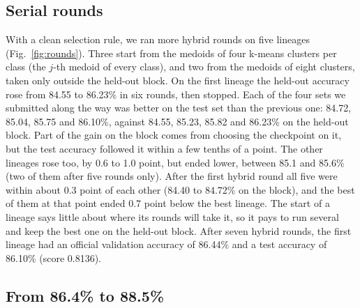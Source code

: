 \documentclass[journal]{IEEEtran}
\begin{document}
\subsection{Serial rounds}
\label{sec:rounds}
With a clean selection rule, we ran more hybrid rounds on five lineages (Fig.~\ref{fig:rounds}). Three start from
the medoids of four k-means clusters per class (the $j$-th medoid of every class), and two from the medoids of
eight clusters, taken only outside the held-out block. On the first lineage the held-out accuracy rose from 84.55
to 86.23\% in six rounds, then stopped. Each of the four sets we submitted along the way was better on the test
set than the previous one: 84.72, 85.04, 85.75 and 86.10\%, against 84.55, 85.23, 85.82 and 86.23\% on the
held-out block. Part of the gain on the block comes from choosing the checkpoint on it, but the test accuracy
followed it within a few tenths of a point. The other lineages rose too, by 0.6 to 1.0 point, but ended lower,
between 85.1 and 85.6\% (two of them after five rounds only). After the first hybrid round all five were within
about 0.3 point of each other (84.40 to 84.72\% on the block), and the best of them at that point ended 0.7 point
below the best lineage. The start of a lineage says little about where its rounds will take it, so it pays to run
several and keep the best one on the held-out block. After seven
hybrid rounds, the first lineage had an official validation accuracy of 86.44\% and a test accuracy of 86.10\% (score
0.8136).

\subsection{From 86.4\% to 88.5\%}
\label{sec:late}
\end{document}
